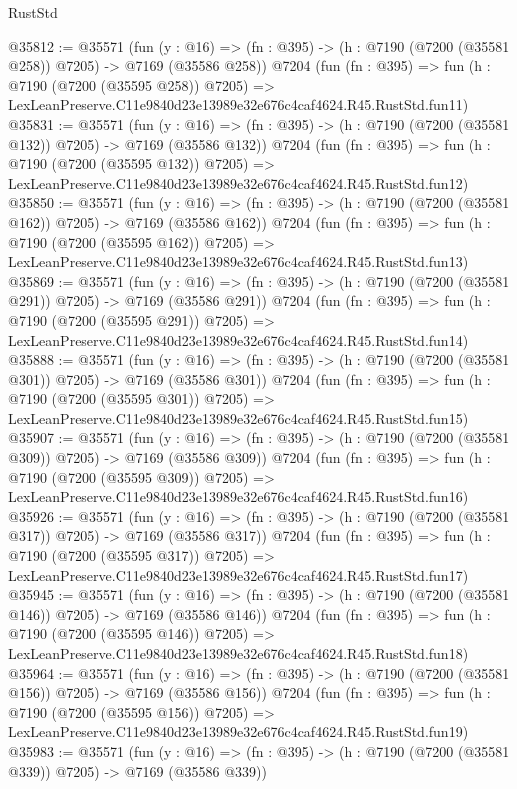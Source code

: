 \begin{lexlean}{RustStd}
\begin{coremodule}
@35812 := @35571
    (fun (y : @16) => (fn : @395) -> (h : @7190 (@7200 (@35581 @258)) @7205) -> @7169 (@35586 @258))
    @7204
    (fun (fn : @395) =>
    fun (h : @7190 (@7200 (@35595 @258)) @7205) =>
    LexLeanPreserve.C11e9840d23e13989e32e676c4caf4624.R45.RustStd.fun11)
@35831 := @35571
    (fun (y : @16) => (fn : @395) -> (h : @7190 (@7200 (@35581 @132)) @7205) -> @7169 (@35586 @132))
    @7204
    (fun (fn : @395) =>
    fun (h : @7190 (@7200 (@35595 @132)) @7205) =>
    LexLeanPreserve.C11e9840d23e13989e32e676c4caf4624.R45.RustStd.fun12)
@35850 := @35571
    (fun (y : @16) => (fn : @395) -> (h : @7190 (@7200 (@35581 @162)) @7205) -> @7169 (@35586 @162))
    @7204
    (fun (fn : @395) =>
    fun (h : @7190 (@7200 (@35595 @162)) @7205) =>
    LexLeanPreserve.C11e9840d23e13989e32e676c4caf4624.R45.RustStd.fun13)
@35869 := @35571
    (fun (y : @16) => (fn : @395) -> (h : @7190 (@7200 (@35581 @291)) @7205) -> @7169 (@35586 @291))
    @7204
    (fun (fn : @395) =>
    fun (h : @7190 (@7200 (@35595 @291)) @7205) =>
    LexLeanPreserve.C11e9840d23e13989e32e676c4caf4624.R45.RustStd.fun14)
@35888 := @35571
    (fun (y : @16) => (fn : @395) -> (h : @7190 (@7200 (@35581 @301)) @7205) -> @7169 (@35586 @301))
    @7204
    (fun (fn : @395) =>
    fun (h : @7190 (@7200 (@35595 @301)) @7205) =>
    LexLeanPreserve.C11e9840d23e13989e32e676c4caf4624.R45.RustStd.fun15)
@35907 := @35571
    (fun (y : @16) => (fn : @395) -> (h : @7190 (@7200 (@35581 @309)) @7205) -> @7169 (@35586 @309))
    @7204
    (fun (fn : @395) =>
    fun (h : @7190 (@7200 (@35595 @309)) @7205) =>
    LexLeanPreserve.C11e9840d23e13989e32e676c4caf4624.R45.RustStd.fun16)
@35926 := @35571
    (fun (y : @16) => (fn : @395) -> (h : @7190 (@7200 (@35581 @317)) @7205) -> @7169 (@35586 @317))
    @7204
    (fun (fn : @395) =>
    fun (h : @7190 (@7200 (@35595 @317)) @7205) =>
    LexLeanPreserve.C11e9840d23e13989e32e676c4caf4624.R45.RustStd.fun17)
@35945 := @35571
    (fun (y : @16) => (fn : @395) -> (h : @7190 (@7200 (@35581 @146)) @7205) -> @7169 (@35586 @146))
    @7204
    (fun (fn : @395) =>
    fun (h : @7190 (@7200 (@35595 @146)) @7205) =>
    LexLeanPreserve.C11e9840d23e13989e32e676c4caf4624.R45.RustStd.fun18)
@35964 := @35571
    (fun (y : @16) => (fn : @395) -> (h : @7190 (@7200 (@35581 @156)) @7205) -> @7169 (@35586 @156))
    @7204
    (fun (fn : @395) =>
    fun (h : @7190 (@7200 (@35595 @156)) @7205) =>
    LexLeanPreserve.C11e9840d23e13989e32e676c4caf4624.R45.RustStd.fun19)
@35983 := @35571
    (fun (y : @16) => (fn : @395) -> (h : @7190 (@7200 (@35581 @339)) @7205) -> @7169 (@35586 @339))

\end{coremodule}
\end{lexlean}
